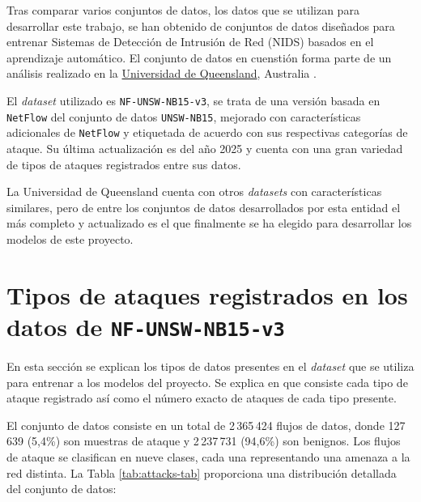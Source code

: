 Tras comparar varios conjuntos de datos, los datos que se utilizan para desarrollar este trabajo, se han obtenido de  conjuntos de datos diseñados para entrenar Sistemas de Detección de Intrusión de Red (NIDS) basados en el aprendizaje automático. El conjunto de datos en cuenstión  forma parte de un análisis realizado en la \href{https://staff.itee.uq.edu.au/marius/NIDS_datasets/}{Universidad de Queensland}, Australia \cite{luay2025NetFlowDatasetsV3}.

El \textit{dataset} utilizado es \texttt{NF-UNSW-NB15-v3}, se trata de una versión basada en \texttt{NetFlow} del conjunto de datos \texttt{UNSW-NB15}, mejorado con características adicionales de \texttt{NetFlow} y etiquetada de acuerdo con sus respectivas categorías de ataque. Su última actualización es del año 2025 y cuenta con una gran variedad de tipos de ataques registrados entre sus datos.

La Universidad de Queensland cuenta con otros \textit{datasets} con características similares, pero de entre los conjuntos de datos desarrollados por esta entidad el más completo y actualizado es el que finalmente se ha elegido para desarrollar los modelos de este proyecto.

\section{Tipos de ataques registrados en los datos de \texttt{NF-UNSW-NB15-v3}} \label{sec.tipo-ataques}
En esta sección se explican los tipos de datos presentes en el \textit{dataset} que se utiliza para entrenar a los modelos del proyecto. Se explica en que consiste cada tipo de ataque registrado así como el número exacto de ataques de cada tipo presente.

El conjunto de datos consiste en un total de 2\,365\,424 flujos de datos, donde 127\,639 (5,4\%) son muestras de ataque y 2\,237\,731 (94,6\%) son benignos. Los flujos de ataque se clasifican en nueve clases, cada una representando una amenaza a la red distinta. La Tabla \ref{tab:attacks-tab} proporciona una distribución detallada del conjunto de datos:


